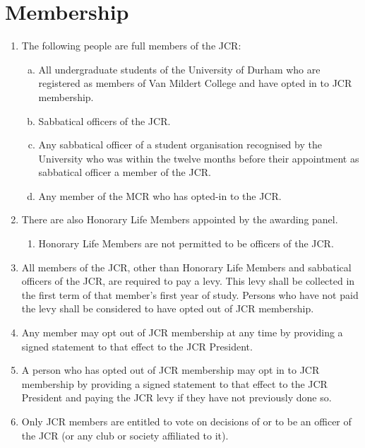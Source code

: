 \documentclass[12pt]{article}  %
\begin{document}
\section{Membership}
\begin{enumerate}
    \item The following people are full members of the JCR:
    \begin{enumerate}[(a)]
        \item All undergraduate students of the University of Durham who are registered as members of Van Mildert College and have opted in to JCR membership.
        \item Sabbatical officers of the JCR.
        \item Any sabbatical officer of a student organisation recognised by the University who was within the twelve months before their appointment as sabbatical officer a member of the JCR.
        \item Any member of the MCR who has opted-in to the JCR.
    \end{enumerate}
    \item There are also Honorary Life Members appointed by the awarding panel.
    \begin{enumerate}
        \item Honorary Life Members are not permitted to be officers of the JCR.
    \end{enumerate}
    \item All members of the JCR, other than Honorary Life Members and sabbatical officers of the JCR, are required to pay a levy. This levy shall be collected in the first term of that member’s first year of study. Persons who have not paid the levy shall be considered to have opted out of JCR membership.
    \item Any member may opt out of JCR membership at any time by providing a signed statement to that effect to the JCR President.
    \item A person who has opted out of JCR membership may opt in to JCR membership by providing a signed statement to that effect to the JCR President and paying the JCR levy if they have not previously done so.
    \item Only JCR members are entitled to vote on decisions of or to be an officer of the JCR (or any club or society affiliated to it).
\end{enumerate}
\newpage
\end{document}
